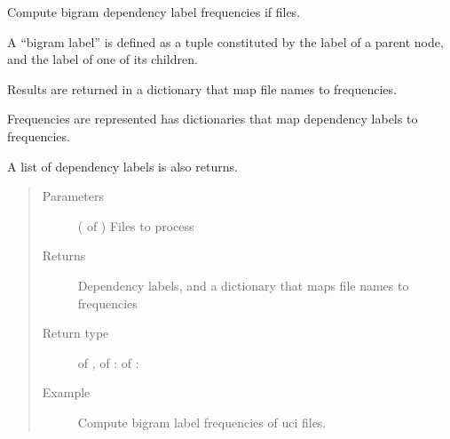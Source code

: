 \documentclass[letterpaper,10pt,english]{sphinxmanual}
\begin{document}
\begin{fulllineitems}
\label{\detokenize{analysis:loacore.analysis.frequencies.bigram_label_frequencies}}
Compute bigram dependency label frequencies if files.

A “bigram label” is defined as a tuple constituted by the label of a parent node, and the label of one of its
children.

Results are returned in a dictionary that map file names to frequencies.

Frequencies are represented has dictionaries that map dependency labels to frequencies.

A list of dependency labels is also returns.
\begin{quote}\begin{description}
\item[{Parameters}] \leavevmode
{} ( of ) \textendash{} Files to process

\item[{Returns}] \leavevmode
Dependency labels, and a dictionary that maps file names to frequencies

\item[{Return type}] \leavevmode
{} of  ,  of  :  of  : 

\item[{Example}] \leavevmode
Compute bigram label frequencies of uci files.

\end{description}\end{quote}

\end{fulllineitems}

\end{document}
